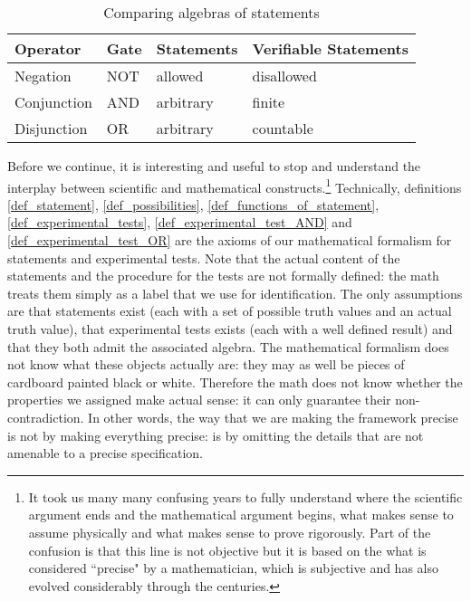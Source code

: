 \documentclass[11pt,letterpaper,fleqn]{memoir} %
\begin{document}
\begin{table}[h]
	\centering
\begin{tabular}{p{} p{} p{} p{}}
	Operator & Gate & Statements & Verifiable Statements \\ 
	\hline 
	Negation & NOT & allowed & disallowed \\ 
	Conjunction & AND & arbitrary  & finite \\ 
	Disjunction & OR & arbitrary  & countable \\ 
\end{tabular}
	\caption{Comparing algebras of statements}
\end{table}

Before we continue, it is interesting and useful to stop and understand the interplay between scientific and mathematical constructs.\footnote{It took us many many confusing years to fully understand where the scientific argument ends and the mathematical argument begins, what makes sense to assume physically and what makes sense to prove rigorously. Part of the confusion is that this line is not objective but it is based on the what is considered ``precise" by a mathematician, which is subjective and has also evolved considerably through the centuries.} Technically, definitions \ref{def_statement}, \ref{def_possibilities}, \ref{def_functions_of_statement}, \ref{def_experimental_tests}, \ref{def_experimental_test_AND} and \ref{def_experimental_test_OR} are the axioms of our mathematical formalism for statements and experimental tests. Note that the actual content of the statements and the procedure for the tests are not formally defined: the math treats them simply as a label that we use for identification. The only assumptions are that statements exist (each with a set of possible truth values and an actual truth value), that experimental tests exists (each with a well defined result) and that they both admit the associated algebra. The mathematical formalism does not know what these objects actually are: they may as well be pieces of cardboard painted black or white. Therefore the math does not know whether the properties we assigned make actual sense: it can only guarantee their non-contradiction. In other words, the way that we are making the framework precise is not by making everything precise: is by omitting the details that are not amenable to a precise specification.
\end{document}
